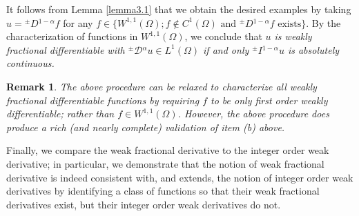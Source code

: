 \documentclass[leqno,final]{siamltex}
\numberwithin{equation}{section}
\newtheorem{remark}{Remark}[section]
\renewcommand{\(}{\bigl(}
\renewcommand{\)}{\bigr)}
\begin{document}
    It follows from Lemma \ref{lemma3.1} that we obtain the desired 
    examples by taking $u  = {^{\pm}}{D}{^{1-\alpha}} f$ 
    for any $f \in \bigl\{ W^{1,1}(\Omega); f \not\in C^{1}(\Omega) \mbox{ and }
    {^{\pm}}{D}{^{1-\alpha}}f \mbox{ exists} \bigr\}$. By the characterization of functions in $W^{1,1}(\Omega)$, %
    we conclude that
	  \textit{$u$ is weakly fractional differentiable with ${^{\pm}}{\mathcal{D}}{^{\alpha}} u \in L^{1}(\Omega)$ if and only ${^{\pm}}{I}{^{1-\alpha}} u$ is absolutely continuous.
    } 
   
   \begin{remark} The above procedure can be relaxed to characterize all weakly fractional differentiable functions by requiring $f$ to be only first order weakly differentiable; rather than $f \in W^{1,1}(\Omega)$. However, the above procedure does produce a rich (and nearly complete) validation of item (b) above. 
   \end{remark}
    
    Finally, we compare the weak fractional derivative to the integer order weak derivative; in particular, we demonstrate that the notion of weak fractional derivative is indeed consistent with, and extends, the notion of integer order weak derivatives by identifying a class of functions so that their weak fractional derivatives exist, but their integer order weak derivatives do not. 
\end{document}
